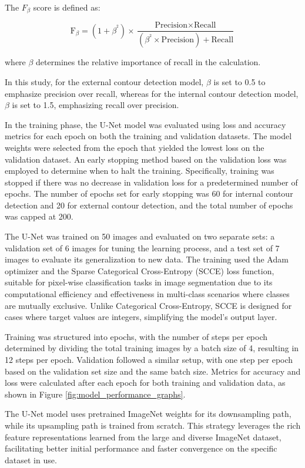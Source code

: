\documentclass[preprint,12pt]{elsarticle}
\begin{document}
The \( F_{\beta} \) score is defined as:

\[
\text{F}_{\beta} = (1 + \beta^{^2}) \times \frac{\text{Precision} \times \text{Recall}}{(\beta^{^2} \times \text{Precision}) + \text{Recall}}
\]

where \(\beta\) determines the relative importance of recall in the calculation.

In this study, for the external contour detection model, \(\beta\) is set to 0.5 to emphasize precision over recall, whereas for the internal contour detection model, \(\beta\) is set to 1.5, emphasizing recall over precision.


In the training phase, the U-Net model was evaluated using loss and accuracy metrics for each epoch on both the training and validation datasets.
The model weights were selected from the epoch that yielded the lowest loss on the validation dataset.
An early stopping method based on the validation loss was employed to determine when to halt the training.
Specifically, training was stopped if there was no decrease in validation loss for a predetermined number of epochs.
The number of epochs set for early stopping was 60 for internal contour detection and 20 for external contour detection, and the total number of epochs was capped at 200.

The U-Net was trained on 50 images and evaluated on two separate sets: a validation set of 6 images for tuning the learning process, and a test set of 7 images to evaluate its generalization to new data. The training used the Adam optimizer and the Sparse Categorical Cross-Entropy (SCCE) loss function, suitable for pixel-wise classification tasks in image segmentation due to its computational efficiency and effectiveness in multi-class scenarios where classes are mutually exclusive. Unlike Categorical Cross-Entropy, SCCE is designed for cases where target values are integers, simplifying the model's output layer.

Training was structured into epochs, with the number of steps per epoch determined by dividing the total training images by a batch size of 4, resulting in 12 steps per epoch. Validation followed a similar setup, with one step per epoch based on the validation set size and the same batch size. Metrics for accuracy and loss were calculated after each epoch for both training and validation data, as shown in Figure \ref{fig:model_performance_graphs}.

The U-Net model uses pretrained ImageNet weights for its downsampling path, while its upsampling path is trained from scratch. This strategy leverages the rich feature representations learned from the large and diverse ImageNet dataset, facilitating better initial performance and faster convergence on the specific dataset in use.
\end{document}

